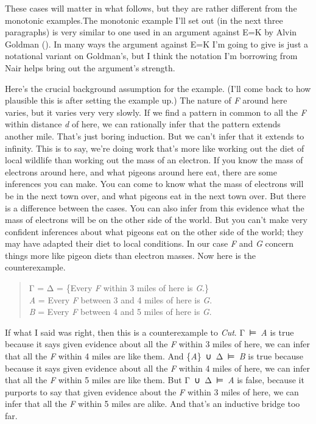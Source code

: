 \documentclass[
  12pt,
  letterpaper,
]{scrbook}
\begin{document}
These cases will matter in what follows, but they are rather different
from the monotonic examples.The monotonic example I'll set out (in the
next three paragraphs) is very similar to one used in an argument
against E=K by Alvin Goldman (). In many
ways the argument against E=K I'm going to give is just a notational
variant on Goldman's, but I think the notation I'm borrowing from Nair
helps bring out the argument's strength.

Here's the crucial background assumption for the example. (I'll come
back to how plausible this is after setting the example up.) The nature
of \emph{F} around here varies, but it varies very very slowly. If we
find a pattern in common to all the \emph{F} within distance \emph{d} of
here, we can rationally infer that the pattern extends another mile.
That's just boring induction. But we can't infer that it extends to
infinity. This is to say, we're doing work that's more like working out
the diet of local wildlife than working out the mass of an electron. If
you know the mass of electrons around here, and what pigeons around here
eat, there are some inferences you can make. You can come to know what
the mass of electrons will be in the next town over, and what pigeons
eat in the next town over. But there is a difference between the cases.
You can also infer from this evidence what the mass of electrons will be
on the other side of the world. But you can't make very confident
inferences about what pigeons eat on the other side of the world; they
may have adapted their diet to local conditions. In our case \emph{F}
and \emph{G} concern things more like pigeon diets than electron masses.
Now here is the counterexample.

\begin{quote}
Γ = Δ = \{Every \emph{F} within 3 miles of here is \emph{G}.\}\\
\emph{A} = Every \emph{F} between 3 and 4 miles of here is \emph{G}.\\
\emph{B} = Every \emph{F} between 4 and 5 miles of here is \emph{G}.
\end{quote}

If what I said was right, then this is a counterexample to \emph{Cut}.
Γ~⊨~\emph{A} is true because it says given evidence about all the
\emph{F} within 3 miles of here, we can infer that all the \emph{F}
within 4 miles are like them. And \{\emph{A}\}~∪~Δ~⊨~\emph{B} is true
because because it says given evidence about all the \emph{F} within 4
miles of here, we can infer that all the \emph{F} within 5 miles are
like them. But Γ~∪~Δ~⊨~\emph{A} is false, because it purports to say
that given evidence about the \emph{F} within 3 miles of here, we can
infer that all the \emph{F} within 5 miles are alike. And that's an
inductive bridge too far.
\end{document}
